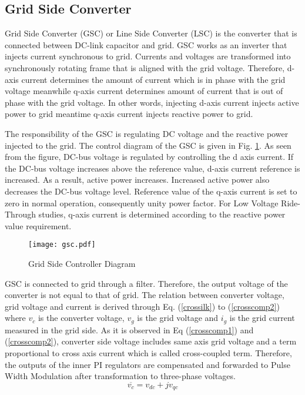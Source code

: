 \subsection{Grid Side Converter}
Grid Side Converter (GSC) or Line Side Converter (LSC) is the converter that is connected between DC-link capacitor and grid. GSC works as an inverter that injects current synchronous to grid. Currents and voltages are transformed into synchronously rotating frame that is aligned with the grid voltage. Therefore, d-axis current determines the amount of current which is in phase with the grid voltage meanwhile q-axis current determines amount of current that is out of phase with the grid voltage. In other words, injecting d-axis current injects active power to grid meantime q-axis current injects reactive power to grid.\par
The responsibility of the GSC is regulating DC voltage and the reactive power injected to the grid. The control diagram of the GSC is given in Fig. \ref{gsc}. As seen from the figure, DC-bus voltage is regulated by controlling the d axis current. If the DC-bus voltage increases above the reference value, d-axis current reference is increased. As a result, active power increases. Increased active power also decreases the DC-bus voltage level. Reference value of the q-axis current is set to zero in normal operation, consequently unity power factor. For Low Voltage Ride-Through studies, q-axis current is determined according to the reactive power value requirement. \cite{Orowska-Kowalska2014} \par
\begin{figure}[h!]
	\centering
	\texttt{[image: gsc.pdf]}
	\caption{Grid Side Controller Diagram}
	\label{gsc}
\end{figure}
GSC is connected to grid through a filter. Therefore, the output voltage of the converter is not equal to that of grid. The relation between converter voltage, grid voltage and current is derived through Eq. (\ref{crossilk}) to (\ref{crosscomp2}) where $v_{c}$ is the converter voltage, $v_{g}$ is the grid voltage and  $i_{g}$ is the grid current measured in the grid side. As it is observed in Eq (\ref{crosscomp1}) and (\ref{crosscomp2}), converter side voltage includes same axis grid voltage and a term proportional to cross axis current which is called cross-coupled term. Therefore, the outputs of the inner PI regulators are compensated and forwarded to Pulse Width Modulation after transformation to three-phase voltages.
\begin{equation}
\overline{v_{c}}=v_{dc}+jv_{qc}
\label{crossilk}
\end{equation}
